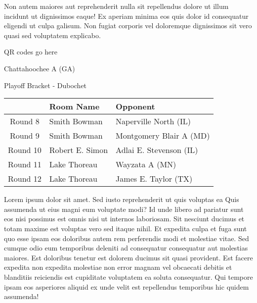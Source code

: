 \documentclass{article}%
\begin{document}
\newline%
Non autem maiores aut reprehenderit nulla sit repellendus dolore ut illum incidunt ut dignissimos eaque! Ex aperiam minima eos quis dolor id consequatur eligendi ut culpa galisum. Non fugiat corporis vel doloremque dignissimos sit vero quasi sed voluptatem explicabo.\newline%
\newline%
%
\vspace*{30pt}%
\begin{center}%
\begin{Huge}%
QR codes go here%
\end{Huge}%
\end{center}%
\newpage%
\begin{center}%
\begin{Huge}%
Chattahoochee A (GA)%
\end{Huge}%
\vspace*{8pt}%
\linebreak%
\begin{Large}%
Playoff Bracket {-} Dubochet%
\end{Large}%
\end{center}%
\begin{tabularx}{\textwidth}{|c|Y|Y|}%
\hline%
&Room Name&Opponent\\%
\hline%
Round 8&Smith Bowman&Naperville North (IL)\\%
Round 9&Smith Bowman&Montgomery Blair A (MD)\\%
Round 10&Robert E. Simon&Adlai E. Stevenson (IL)\\%
Round 11&Lake Thoreau&Wayzata A (MN)\\%
Round 12&Lake Thoreau&James E. Taylor (TX)\\%
\hline%
\end{tabularx}%
\vspace*{8pt}%
\linebreak%
\newline%
\newline%
Lorem ipsum dolor sit amet. Sed iusto reprehenderit ut quis voluptas ea Quis assumenda ut eius magni eum voluptate modi? Id unde libero ad pariatur sunt eos nisi possimus est omnis nisi ut internos laboriosam. Sit nesciunt ducimus et totam maxime est voluptas vero sed itaque nihil. Et expedita culpa et fuga sunt quo esse ipsam eos doloribus autem rem perferendis modi et molestiae vitae.\newline%
\newline%
Sed cumque odio eum temporibus deleniti ad consequatur consequatur aut molestias maiores. Est doloribus tenetur est dolorem ducimus sit quasi provident. Est facere expedita non expedita molestiae non error magnam vel obcaecati debitis et blanditiis reiciendis est cupiditate voluptatem ea soluta consequatur. Qui tempore ipsam eos asperiores aliquid ex unde velit est repellendus temporibus hic quidem assumenda!\newline%
\end{document}
